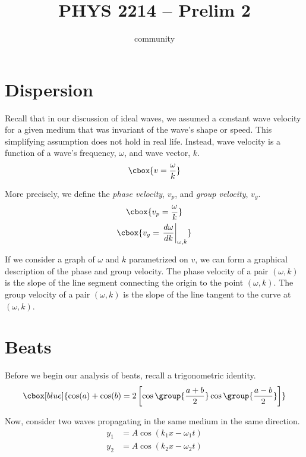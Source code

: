 \documentclass{hw}
\title{PHYS 2214 -- Prelim 2}
\author{community}
\numberwithin{equation}{section}
\begin{document}
\maketitle

\tableofcontents
\newpage{}

\section{Dispersion}
Recall that in our discussion of ideal waves, we assumed a constant wave
velocity for a given medium that was invariant of the wave's shape or speed.
This simplifying assumption does not hold in real life. Instead, wave velocity
is a function of a wave's frequency, $\omega$, and wave vector, $k$.
\begin{equation}
\cbox{%
  v = \frac{\omega}{k}
}
\end{equation}

More precisely, we define the \emph{phase velocity}, $v_p$, and \emph{group
velocity}, $v_g$.
\begin{gather}
  \cbox{v_p = \frac{\omega}{k}} \\
  \cbox{v_g = \left. \frac{d\omega}{dk} \right|_{\omega, k}}
\end{gather}

If we consider a graph of $\omega$ and $k$ parametrized on $v$, we can form a
graphical description of the phase and group velocity. The phase velocity of a
pair $(\omega, k)$ is the slope of the line segment connecting the origin to
the point $(\omega, k)$. The group velocity of a pair $(\omega, k)$ is the
slope of the line tangent to the curve at $(\omega, k)$.

\section{Beats}
Before we begin our analysis of beats, recall a trigonometric identity.
\begin{equation}\label{eq:beats-trig}
\cbox[blue]{%
  \cos(a) + \cos(b) = 2 \left[ 
    \cos\group{\frac{a+b}{2}} \cos\group{\frac{a-b}{2}} 
  \right]
}
\end{equation}

Now, consider two waves propagating in the same medium in the same direction.
\begin{align*}
  y_1 &= A \cos(k_1 x - \omega_1 t) \\
  y_2 &= A \cos(k_2 x - \omega_2 t)
\end{align*}
\end{document}
